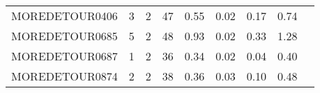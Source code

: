 {\begin{tabular}{l|r|r|r|r|r|r|r|l}
MOREDETOUR0406                              & 3                                                                                                 & 2                                                                                                & 47                                                                                                                   & 0.55                            & 0.02                    & {\color[HTML]{00009B} 0.17}    & 0.74                       \\
MOREDETOUR0685                              & 5                                                                                                 & 2                                                                                                & 48                                                                                                                   & 0.93                            & 0.02                    & {\color[HTML]{00009B} 0.33}    & 1.28                       \\
MOREDETOUR0687                              & 1                                                                                                 & 2                                                                                                & 36                                                                                                                   & 0.34                            & 0.02                    & {\color[HTML]{00009B} 0.04}    & 0.40                       \\
MOREDETOUR0874                              & 2                                                                                                 & 2                                                                                                & 38                                                                                                                   & 0.36                            & 0.03                    & {\color[HTML]{00009B} 0.10}    & 0.48                                                         
\end{tabular}%
}